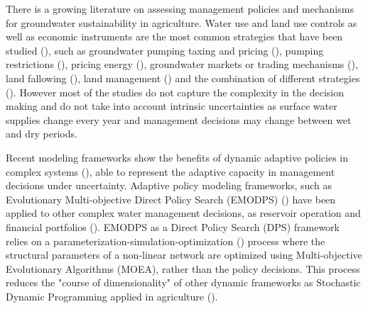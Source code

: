 \documentclass[11pt,a4paper]{article}
\begin{document}
There is a growing literature on assessing management policies and mechanisms for groundwater sustainability in agriculture. Water use and land use controls as well as economic instruments are the most common strategies that have been studied (\cite{clifton_water_2010}), such as groundwater pumping taxing and pricing (\cite{madani_exogenous_2013,mulligan_assessing_2014,stone_economic_2022}), pumping restrictions (\cite{young_hydrologic-economic_2021,lan_performance_2021,macewan_hydroeconomic_2017,rodriguez-flores_global_2022}), pricing energy (\cite{hrozencik_impacts_2022}), groundwater markets or trading mechanisms (\cite{khan_effect_2019,kuwayama_regulation_2013}), land fallowing (\cite{van_schmidt_linkages_2022}), land management (\cite{bourque_balancing_2019,li_evaluation_2018,bryant_shaping_2020}) and the combination of different strategies (\cite{graveline_combining_2019,hrozencik_heterogeneous_2017}). However most of the studies do not capture the complexity in the decision making  and do not take into account intrinsic uncertainties as surface water supplies change every year and management decisions may change between wet and dry periods. 

Recent modeling frameworks show the benefits of dynamic adaptive policies in complex systems (\cite{herman_climate_2020,walker_adapt_2013}), able to  represent the adaptive capacity in management decisions under uncertainty.  Adaptive policy modeling frameworks, such as Evolutionary Multi-objective Direct Policy Search (EMODPS) (\cite{giuliani_curses_2016,macian-sorribes_inferring_2019}) have been applied to other complex water management decisions, as reservoir operation and financial portfolios (\cite{zatarain_salazar_balancing_2017,gupta_can_2020}). EMODPS as a Direct Policy Search (DPS) framework relies on a parameterization-simulation-optimization (\cite{koutsoyiannis_evaluation_2003}) process where the structural parameters of a non-linear network are optimized using Multi-objective Evolutionary Algorithms (MOEA), rather than the policy decisions. This process reduces the "course of dimensionality" of other dynamic frameworks as Stochastic Dynamic Programming applied in agriculture (\cite{taylor_dynamic_1993}). 
\end{document}
